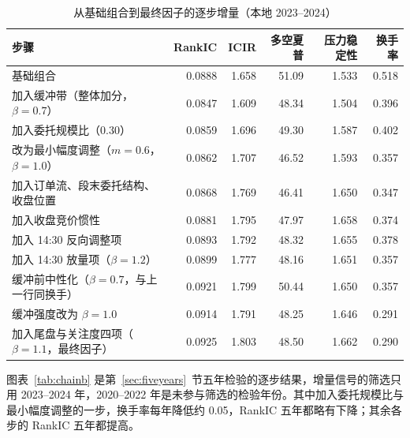 \documentclass[UTF8,a4paper,zihao=-4,fontset=none]{ctexart}
\newcommand{\tablesetup}{\small\linespread{1.08}\selectfont\renewcommand{\arraystretch}{1.22}}
\begin{document}
\begin{table}[htbp]
\caption{从基础组合到最终因子的逐步增量（本地 2023–2024）}\label{tab:chain}
\centering
{\tablesetup
\begin{tabularx}{\textwidth}{@{}L rrrrr@{}}
\toprule
步骤 & RankIC & ICIR & 多空夏普 & 压力稳定性 & 换手率\\
\midrule
基础组合 & 0.0888 & 1.658 & 51.09 & 1.533 & 0.518\\
加入缓冲带（整体加分，$\beta=0.7$） & 0.0847 & 1.609 & 48.34 & 1.504 & 0.396\\
加入委托规模比（0.30） & 0.0859 & 1.696 & 49.30 & 1.587 & 0.402\\
改为最小幅度调整（$m=0.6$，$\beta=1.0$） & 0.0862 & 1.707 & 46.52 & 1.593 & 0.357\\
加入订单流、段末委托结构、收盘位置 & 0.0868 & 1.769 & 46.41 & 1.650 & 0.347\\
加入收盘竞价惯性 & 0.0881 & 1.795 & 47.97 & 1.658 & 0.374\\
加入 14:30 反向调整项 & 0.0893 & 1.792 & 48.32 & 1.655 & 0.378\\
加入 14:30 放量项（$\beta=1.2$） & 0.0899 & 1.777 & 48.16 & 1.651 & 0.357\\
缓冲前中性化（$\beta=0.7$，与上一行同换手） & 0.0921 & 1.799 & 50.44 & 1.650 & 0.357\\
缓冲强度改为 $\beta=1.0$ & 0.0914 & 1.791 & 48.25 & 1.646 & 0.291\\
加入尾盘与关注度四项（$\beta=1.1$，最终因子） & 0.0925 & 1.803 & 48.50 & 1.662 & 0.290\\
\bottomrule
\end{tabularx}}
\end{table}

图表~\ref{tab:chainb} 是第~\ref{sec:fiveyears}~节五年检验的逐步结果，增量信号的筛选只用 2023–2024 年，2020–2022 年是未参与筛选的检验年份。其中加入委托规模比与最小幅度调整的一步，换手率每年降低约 0.05，RankIC 五年都略有下降；其余各步的 RankIC 五年都提高。
\end{document}
